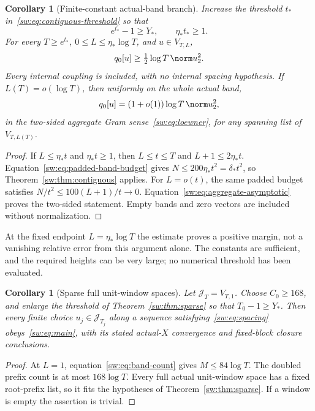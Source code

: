 \documentclass[11pt,a4paper]{article}
\numberwithin{equation}{section}
\newtheorem{corollary}[theorem]{Corollary}
\theoremstyle{definition}\newtheorem{definition}[theorem]{Definition}
\theoremstyle{remark}\newtheorem{remark}[theorem]{Remark}
\begin{document}
\begin{corollary}[Finite-constant actual-band branch]\label{sw:cor:contiguous-jets}
Increase the threshold $t_*$ in~\eqref{sw:eq:contiguous-threshold} so that
\begin{equation}\label{sw:eq:actual-threshold}
 e^{t_*}-1\ge Y_*,\qquad \eta_*t_*\ge1.
\end{equation}
For every $T\ge e^{t_*}$, $0\le L\le\eta_*\log T$, and $u\in V_{T,L}$,
\begin{equation}\label{sw:eq:actual-contiguous}
 q_0[u]\ge\tfrac12\log T\,\norm u_2^2.
\end{equation}
Every internal coupling is included, with no internal spacing hypothesis. If $L(T)=o(\log T)$, then uniformly on the whole actual band,
\begin{equation}\label{sw:eq:actual-asymptotic}
 q_0[u]=(1+o(1))\log T\,\norm u_2^2,
\end{equation}
in the two-sided aggregate Gram sense~\eqref{sw:eq:loewner}, for any spanning list of $V_{T,L(T)}$.
\end{corollary}
\begin{proof}
If $L\le\eta_*t$ and $\eta_*t\ge1$, then $L\le t\le T$ and $L+1\le2\eta_*t$. Equation~\eqref{sw:eq:padded-band-budget} gives
$N\le200\eta_*t^2=\delta_*t^2$, so Theorem~\ref{sw:thm:contiguous} applies. For $L=o(t)$, the same padded budget satisfies $N/t^2\le100(L+1)/t\to0$. Equation~\eqref{sw:eq:aggregate-asymptotic} proves the two-sided statement. Empty bands and zero vectors are included without normalization.
\end{proof}
At the fixed endpoint $L=\eta_*\log T$ the estimate proves a positive margin, not a vanishing relative error from this argument alone. The constants are sufficient, and the required heights can be very large; no numerical threshold has been evaluated.

\begin{corollary}[Sparse full unit-window spaces]\label{sw:cor:zeros}
Let $\mathcal J_T=V_{T,1}$. Choose $C_0\ge168$, and enlarge the threshold of Theorem~\ref{sw:thm:sparse} so that $T_0-1\ge Y_*$. Then every finite choice $u_j\in\mathcal J_{T_j}$ along a sequence satisfying~\eqref{sw:eq:spacing} obeys~\eqref{sw:eq:main}, with its stated actual-$X$ convergence and fixed-block closure conclusions.
\end{corollary}
\begin{proof}
At $L=1$, equation~\eqref{sw:eq:band-count} gives $M\le84\log T$. The doubled prefix count is at most $168\log T$. Every full actual unit-window space has a fixed root-prefix list, so it fits the hypotheses of Theorem~\ref{sw:thm:sparse}. If a window is empty the assertion is trivial.
\end{proof}
\end{document}
